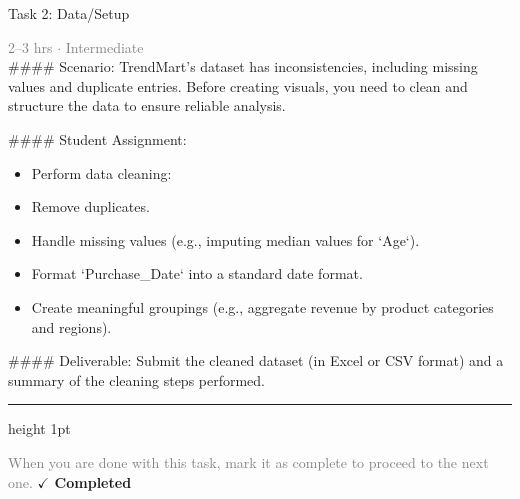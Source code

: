 \documentclass[10pt,a4paper]{article}
\begin{document}
\begin{taskbox}{Task 2: Data/Setup}

    {\small \textcolor{gray}{2--3 hrs $\cdot$ Intermediate}}\\[12pt]

    \#\#\#\# Scenario:
TrendMart’s dataset has inconsistencies, including missing values and duplicate entries. Before creating visuals, you need to clean and structure the data to ensure reliable analysis.

\#\#\#\# Student Assignment:
\begin{itemize}
    \item Perform data cleaning:
    \item Remove duplicates.
    \item Handle missing values (e.g., imputing median values for `Age`).
    \item Format `Purchase\_Date` into a standard date format.
    \item Create meaningful groupings (e.g., aggregate revenue by product categories and regions).
\end{itemize}

\#\#\#\# Deliverable:
Submit the cleaned dataset (in Excel or CSV format) and a summary of the cleaning steps performed.\par

    \vspace{16pt}

    \textcolor{cardBorder}{\hrule height 1pt}\vspace{8pt}

    \small \textcolor{gray}{When you are done with this task, mark it as complete to proceed to the next one.} \hfill \textbf{\textcolor{brandDark}{$\checkmark$ Completed}}

\end{taskbox}
\end{document}
